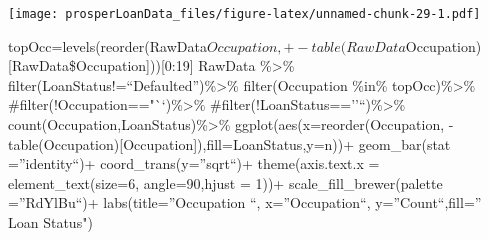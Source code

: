 \documentclass[]{article}
\newenvironment{Shaded}{\begin{snugshade}}{\end{snugshade}}
\newcommand{\CommentTok}[1]{\textcolor[rgb]{0.56,0.35,0.01}{\textit{#1}}}
\newcommand{\DataTypeTok}[1]{\textcolor[rgb]{0.13,0.29,0.53}{#1}}
\newcommand{\DecValTok}[1]{\textcolor[rgb]{0.00,0.00,0.81}{#1}}
\newcommand{\KeywordTok}[1]{\textcolor[rgb]{0.13,0.29,0.53}{\textbf{#1}}}
\newcommand{\NormalTok}[1]{#1}
\newcommand{\OperatorTok}[1]{\textcolor[rgb]{0.81,0.36,0.00}{\textbf{#1}}}
\newcommand{\StringTok}[1]{\textcolor[rgb]{0.31,0.60,0.02}{#1}}
\begin{document}
\begin{Shaded}
\end{Shaded}

\texttt{[image: prosperLoanData\_files/figure-latex/unnamed-chunk-29-1.pdf]}

topOcc=levels(reorder(RawData\(Occupation,+-table(RawData\)Occupation){[}RawData\$Occupation{]})){[}0:19{]}
RawData \%\textgreater{}\%
filter(LoanStatus!=``Defaulted'')\%\textgreater{}\% filter(Occupation
\%in\% topOcc)\%\textgreater{}\%
\#filter(!Occupation=="``)\%\textgreater{}\%
\#filter(!LoanStatus==''``)\%\textgreater{}\%
count(Occupation,LoanStatus)\%\textgreater{}\%
ggplot(aes(x=reorder(Occupation,
-table(Occupation){[}Occupation{]}),fill=LoanStatus,y=n))+
geom\_bar(stat =''identity``)+ coord\_trans(y=''sqrt``)+
theme(axis.text.x = element\_text(size=6, angle=90,hjust = 1))+
scale\_fill\_brewer(palette =''RdYlBu``)+ labs(title=''Occupation ``,
x=''Occupation``, y=''Count``,fill='' Loan Status")
\end{document}
